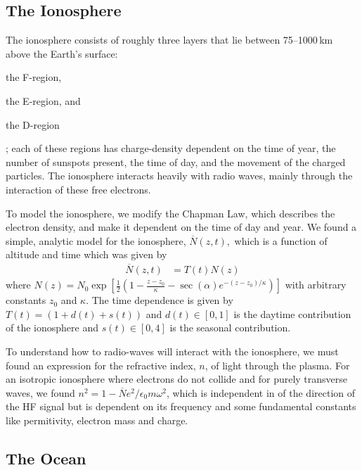 \documentclass[11pt, twocolumn]{article}
\numberwithin{equation}{section}
\begin{document}

\subsection{The Ionosphere} %
\label{sub:the_ionosphere}

The ionosphere consists of roughly three layers that lie between 75--1000\,km above the Earth's surface:
\begin{enumerate*}[(1)]
    \item the F-region,
    \item the E-region, and
    \item the D-region
\end{enumerate*}; each of these regions has charge-density dependent on the time of year, the number of sunspots present, the time of day, and the movement of the charged particles. The ionosphere interacts heavily with radio waves, mainly through the interaction of these free electrons.\cite{budden1961radio}

To model the ionosphere, we modify the Chapman Law,\cite{chapman1931a,chapman1931b,budden1961radio,budden1988propagation} which describes the electron density, and make it dependent on the time of day and year. We found a simple, analytic model for the ionosphere, $\overline N(z,t),$ which is a function of altitude and time which was given by
\begin{align}
    \overline N(z,t) &= T(t)N(z)
    \label{eq:final_eden}
\end{align}
where $N(z) = N_0\exp\left[\frac12\left(1 - \frac{z-z_0}{\kappa} - \sec(\alpha) e^{- (z - z_0)/\kappa}\right)\right]$ with arbitrary constants $z_0$ and $\kappa$. The time dependence is given by $T(t) = (1 + d(t) + s(t))$ and $d(t) \in [0,1]$ is the daytime contribution of the ionosphere and $s(t)\in[0,4]$ is the seasonal contribution.

To understand how to radio-waves will interact with the ionosphere, we must found  an expression for the refractive index, $n$, of light through the plasma. For an isotropic ionosphere where electrons do not collide and for purely transverse waves, we found $n^2 = 1 - \overline N e^2/\epsilon_0 m \omega^2$, which is independent in of the direction of the HF signal but is dependent on its frequency and some fundamental constants like permitivity, electron mass and charge.

\subsection{The Ocean } %
\label{sub:the_ocean} 
\end{document}
